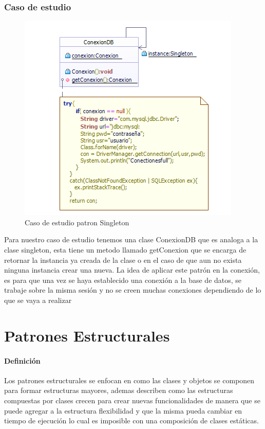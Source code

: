 \subsubsection{Caso de estudio}
\begin{figure}[h!]
	\centering
	\includegraphics[width=0.7\linewidth]{arquitectura/imagenes/PatronSingeltonCasoEstudio}
	\caption{Caso de estudio patron Singleton}
\end{figure}

Para nuestro caso de estudio tenemos una clase ConexionDB que es analoga a la clase singleton, esta tiene un metodo llamado getConexion que se encarga de retornar la instancia ya creada de la clase o en el caso de que aun no exista ninguna instancia crear una nueva.\newline
La idea de  aplicar este patrón en la conexión, es para que una vez se haya establecido una conexión a la base de datos, se trabaje sobre la misma sesión y no se creen muchas conexiones dependiendo de lo que se vaya a realizar  

\newpage

\section{Patrones Estructurales}
\paragraph{Definición}
Los patrones estructurales se enfocan en como las clases y objetos se componen para formar estructuras mayores, ademas describen como las estructuras compuestas por clases crecen para crear nuevas funcionalidades de manera que se puede agregar a la estructura flexibilidad y que la misma pueda cambiar en tiempo de ejecución lo cual es imposible con una composición de clases estáticas.
